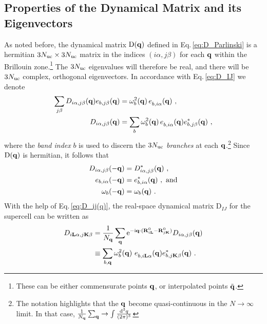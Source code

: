 \subsection{Properties of the Dynamical Matrix and its Eigenvectors}
\label{sec:dynmat.periodic}
As noted before, the dynamical matrix ${\rm D} ({\bf q})$ defined in Eq.\,\eqref{eq:D_Parlinski} is a hermitian $3N_{\rm uc} \times 3N_{\rm uc}$ matrix in the indices $(i \alpha, j \beta)$ for each ${\bf q}$ within the Brillouin zone.\footnote{These can be either commensurate points $\bf q$, or interpolated points $\tilde{\bf q}$.} The $3N_{\rm uc}$ eigenvalues will therefore be real, and there will be $3N_{\rm uc}$ complex, orthogonal eigenvectors. In accordance with Eq.\,\eqref{eq:D_IJ} we denote
\begin{subequations}
\label{eq:D_ij(q)}
\begin{align}
	\sum_{j \beta} {D}_{i \alpha, j \beta} (\b q) e_{b, j \beta} (\b q)
		&= \omega^2_b (\b q) \, \fD e_{b, i \alpha} (\b q)~,
	\label{eq:D_ij(q)w} \\
	{D}_{i \alpha, j \beta} (\b q)
		&= \sum_b \omega^2_b (\b q) \, \fD e_{b, i \alpha} (\b q) e^\ast_{b, j \beta} (\b q)~,
\end{align}
\end{subequations}
where the \emph{band index} $b$ is used to discern the $3N_{\rm uc}$ \emph{branches} at each ${\bf q}$.\footnote{The notation highlights that the ${\bf q}$ become quasi-continuous in the $N \to \infty$ limit. In that case, $\frac{1}{N_{{\bf q}}} \sum_{{\bf q}} \to \int \frac{{\rm d}^3 q}{(2 \pi)^3}$} 
Since ${\rm D} ({\bf q})$ is hermitian, it follows that
\begin{align}
	D_{i \alpha, j \beta} (- {\bf q}) 
		& = D_{i \alpha, j \beta}^\ast ({\bf q})~, \\
	e_{b, i \alpha} (- {\bf q})
		&= e^\ast_{b, i \alpha} ({\bf q})~,\text{ and} \\
	\omega_b (- {\bf q})
		&= \omega_b ({\bf q})~.
\end{align}
With the help of Eq.\,\eqref{eq:D_ij(q)}, the real-space dynamical matrix $\mathrm D_{IJ}$ for the supercell can be written as
\begin{align}
	D_{i \b L \alpha, j \b K \beta}  
		& = \frac{1}{N_{\b q}} \sum_{\b q} {\rm e}^{- \im \b q \cdot (\b R_{i \b L}^0 - \b R_{j \b K}^0)} {D}_{i \alpha, j \beta} (\b q) \\
		& \equiv  \sum_{b, \b q} \omega_b^2 (\b q) ~ \fD e_{b, i \b L \alpha} (\b q) e^{\ast}_{b, j \b K \beta} (\b q)~.
	\label{eq:D_{iLa}}
\end{align}
